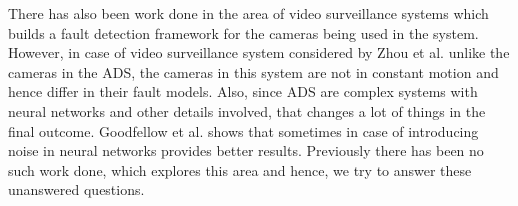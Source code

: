 There has also been work done in the area of video surveillance systems which builds a fault detection framework for  the cameras being used in the system. However, in case of video surveillance system considered by Zhou et al. \cite{Zhou} unlike the cameras in the ADS, the cameras in this system are not in constant motion and hence differ in their fault models. Also, since ADS are complex systems with neural networks and other details involved, that changes a lot of things in the final outcome. Goodfellow et al. \cite{Goodfellow} shows that sometimes in case of introducing noise in neural networks provides better results. Previously there has been no such work done, which explores this area and hence, we try to answer these unanswered questions.
  